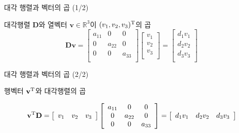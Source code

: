 \documentclass{beamer}
\begin{document}
\begin{frame}{대각 행렬과 벡터의 곱 (1/2)}

대각행렬 $\mathbf D$와 열벡터 $\mathbf v \in \mathbb R^3$이 $(v_1, v_2, v_3)^{\rm T}$의 곱
$$
\mathbf {Dv} = 
\left [ 
\begin{array}{ccc}
a_{11} & 0 & 0 \\
0 & a_{22} & 0 \\
0 & 0 & a_{33} \\
\end{array}
\right ]
\left [
\begin{array}{c}
v_1 \\
v_2 \\
v_3 \\
\end{array}
\right ]
=
\left [
\begin{array}{c}
d_1 v_1 \\
d_2 v_2 \\
d_3 v_3 \\
\end{array}
\right ]
$$
\end{frame}


\begin{frame}{대각 행렬과 벡터의 곱 (2/2)}

행벡터 $\mathbf v^{\rm T}$와 대각행렬의 곱

$$
\mathbf v^{\rm T} \mathbf D = 
\left [
\begin{array}{ccc}
v_1 & v_2 & v_3 \\
\end{array}
\right ]
\left [ 
\begin{array}{ccc}
a_{11} & 0 & 0 \\
0 & a_{22} & 0 \\
0 & 0 & a_{33} \\
\end{array}
\right ]
=
\left [
\begin{array}{ccc}
d_1 v_1 & d_2 v_2 &d_3 v_3 \\
\end{array}
\right ]
$$

\end{frame}
\end{document}
